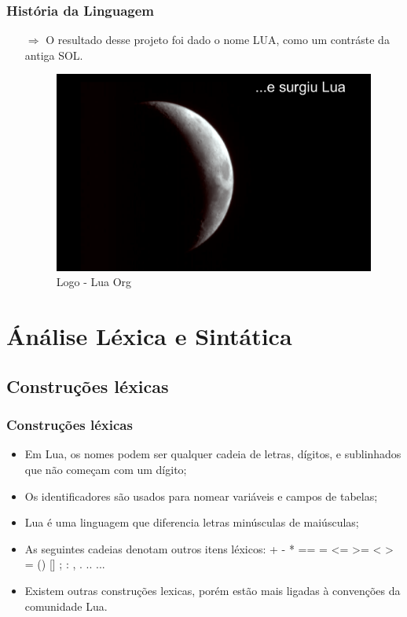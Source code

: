 \documentclass{beamer}
\begin{document}
\begin{frame}[fragile]
\frametitle{História da Linguagem}
	\begin{itemize}
		\item[$\Rightarrow$] O resultado desse projeto foi dado o nome LUA, como um contráste da antiga SOL.
		\begin{figure}[!htb]
			\centering
			\includegraphics[width=1\linewidth]{imagens/lua}
			\caption{Logo - Lua Org}
		\end{figure}
	\end{itemize}
\end{frame}

\section{Ánálise Léxica e Sintática}
\subsection{Construções léxicas}
\begin{frame}[fragile]
\frametitle{Construções léxicas}
	\begin{itemize}
	\item Em Lua, os nomes podem ser qualquer cadeia de letras, dígitos, e sublinhados que não começam com um dígito; 
	\item Os identificadores são usados para nomear variáveis e campos de tabelas;
	\item Lua é uma linguagem que diferencia letras minúsculas de maiúsculas;
	\item As seguintes cadeias denotam outros itens léxicos: + - * == = <= >= < > = () [] ; : , . .. ...
	\item Existem outras construções lexicas, porém estão mais ligadas à convenções da comunidade Lua.
	\end{itemize}
\end{frame}
\end{document}
